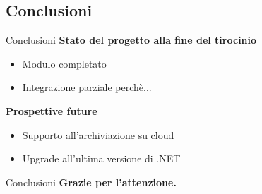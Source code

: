 \documentclass{beamer}
\begin{document}
\begin{darkframes}
    \subsection{Conclusioni}
    \begin{frame}{Conclusioni}
      \textbf{Stato del progetto alla fine del tirocinio}
      \begin{itemize}
        \item Modulo completato
        \item Integrazione parziale perchè...
      \end{itemize}
      \textbf{Prospettive future}
      \begin{itemize}
        \item Supporto all'archiviazione su cloud
        \item Upgrade all'ultima versione di .NET
      \end{itemize}
    \end{frame}

    \begin{frame}{Conclusioni}
      \textbf{Grazie per l'attenzione.}
    \end{frame}

  \end{darkframes}
  
\end{document}
